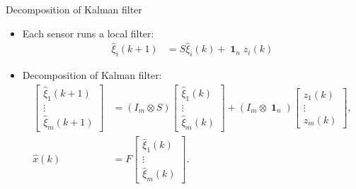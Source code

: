 \documentclass[10pt]{beamer}
\DeclareMathOperator{\1}{\textbf{1}}
\begin{document}
\begin{frame}{Decomposition of Kalman filter}
	\begin{itemize}
		\item Each sensor runs a local filter:
		\begin{align*}
		\hat \xi_i(k+1)&=S\hat\xi_i(k)+\1_n z_i(k)
		\end{align*}
		
		\item Decomposition of Kalman filter:
		\begin{align}
		\begin{bmatrix}
		\hat \xi_1(k+1) \\
		\vdots\\
		\hat \xi_m(k+1)
		\end{bmatrix}&=
		(I_m\otimes S)
		\begin{bmatrix}
		\hat \xi_1(k) \\
		\vdots\\
		\hat \xi_m(k)
		\end{bmatrix}+
		(I_m\otimes \1_n)
		\begin{bmatrix}
		z_1(k) \\
		\vdots\\
		z_m(k)
		\end{bmatrix},\\
		\hat{x}(k) &= F
		\begin{bmatrix}
	    \hat \xi_1(k) \\
		\vdots\\
		\hat \xi_m(k)
		\end{bmatrix}.
		\end{align}
	\end{itemize}
\end{frame}
\end{document}
